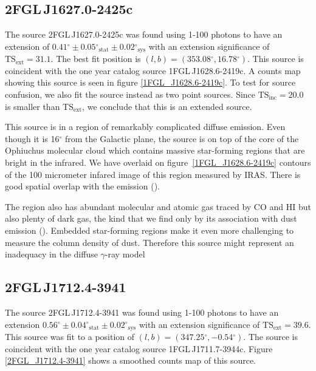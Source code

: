 \documentclass[12pt,preprint]{aastex}
\newcommand{\gev}{\text{GeV}\xspace}
\newcommand{\tsext}{{\ensuremath{\text{TS}_{\text{ext}}}}\xspace}
\newcommand{\tsinc}{\ensuremath{\text{TS}_{\text{inc}}}\xspace}
\newcommand{\sys}{\text{sys}\xspace}
\newcommand{\stat}{\text{stat}\xspace}
\renewcommand{\deg}{\ensuremath{^\circ}\xspace}
\begin{document}
\subsection{2FGL\,J1627.0-2425c}
\label{section_2FGL_J1627.0-2425c}


The source 2FGL\,J1627.0-2425c was found 
using 1-100 \gev photons to have an 
extension of $0.41\deg\pm0.05\deg_\stat\pm0.02\deg_\sys$ 
with an extension significance of $\tsext=31.1$. 
The best fit position is $(l,b)=(353.08\deg, 16.78\deg)$.
This source is coincident with the one year catalog source 1FGL\,J1628.6-2419c.
A counts map showing this source is
seen in figure \ref{1FGL_J1628.6-2419c}.  To test for source confusion,
we also fit the source instead as two point sources. Since $\tsinc=20.0$
is smaller than \tsext, we conclude that this is an extended source.

This source is in a region of remarkably complicated diffuse emission.
Even though it is 16\deg from the Galactic plane, the source is on top
of the core of the Ophiuchus molecular cloud which contains massive
star-forming regions that are bright in the infrared.  We have overlaid
on figure~\ref{1FGL_J1628.6-2419c} contours of the 100 micrometer infared
image of this region measured by IRAS. There is good spatial overlap
with the \gev emission (\cite{iras_rho_ophiuci}).

The region also has abundant molecular and atomic gas traced by CO
and HI but also plenty of dark gas, the kind that we find only by its
association with dust emission (\cite{isabelle_dark_gass}). Embedded
star-forming regions make it even more challenging to measure the column
density of dust.  Therefore this source might represent an inadequacy
in the diffuse $\gamma$-ray model

\subsection{2FGL\,J1712.4-3941}
\label{section_2FGL_J1712.4-3941}


The source 2FGL\,J1712.4-3941 was found using 1-100 \gev
photons to have an extension $0.56\deg\pm0.04\deg_\stat\pm0.02\deg_\sys$
with an extension significance of $\tsext=39.6$.  This source was
fit to a position of $(l,b)=(347.25\deg,-0.54\deg)$.  The source
is coincident with the one year catalog source 1FGL\,J1711.7-3944c.
Figure \ref{2FGL_J1712.4-3941} shows a smoothed counts map of this source.
\end{document}
